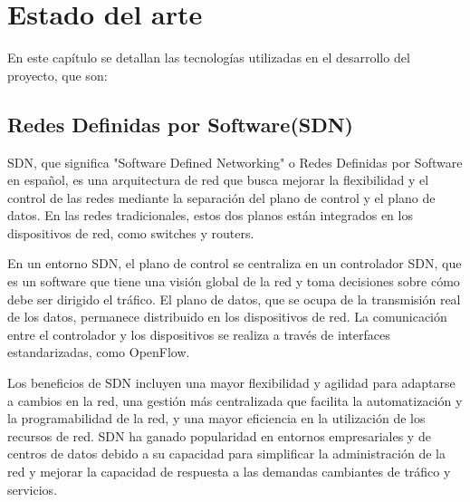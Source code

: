 \documentclass[a4paper, 12pt]{book}
\begin{document}
	
	
	\cleardoublepage
	
	
	
	\cleardoublepage
	\chapter{Estado del arte}
	\label{sec:arte}
	 
		
	En este capítulo se detallan las tecnologías utilizadas en el desarrollo del proyecto, que son:
	
	
	\section{Redes Definidas por Software(SDN)} 
	\label{sec:sdn}
	
	SDN, que significa "Software Defined Networking" o Redes Definidas por Software en español, es una arquitectura de red que busca mejorar la flexibilidad y el control de las redes mediante la separación del plano de control y el plano de datos. En las redes tradicionales, estos dos planos están integrados en los dispositivos de red, como switches y routers.
	
	En un entorno SDN, el plano de control se centraliza en un controlador SDN, que es un software que tiene una visión global de la red y toma decisiones sobre cómo debe ser dirigido el tráfico. El plano de datos, que se ocupa de la transmisión real de los datos, permanece distribuido en los dispositivos de red. La comunicación entre el controlador y los dispositivos se realiza a través de interfaces estandarizadas, como OpenFlow.
	
	Los beneficios de SDN incluyen una mayor flexibilidad y agilidad para adaptarse a cambios en la red, una gestión más centralizada que facilita la automatización y la programabilidad de la red, y una mayor eficiencia en la utilización de los recursos de red. SDN ha ganado popularidad en entornos empresariales y de centros de datos debido a su capacidad para simplificar la administración de la red y mejorar la capacidad de respuesta a las demandas cambiantes de tráfico y servicios.
	
\end{document}
